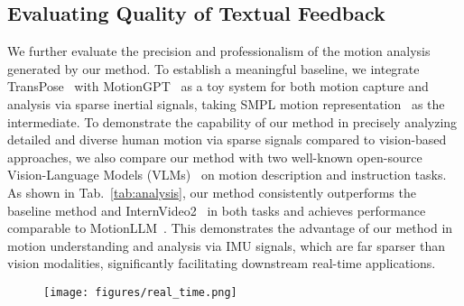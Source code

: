 \subsection{Evaluating Quality of Textual Feedback}
We further evaluate the precision and professionalism of the motion analysis generated by our method. To establish a meaningful baseline, we integrate TransPose~\cite{TransPoseSIGGRAPH2021} with MotionGPT~\cite{jiang2023motiongpt} as a toy system for both motion capture and analysis via sparse inertial signals, taking SMPL motion representation~\cite{SMPL2015} as the intermediate. To demonstrate the capability of our method in precisely analyzing detailed and diverse human motion via sparse signals compared to vision-based approaches, we also compare our method with two well-known open-source Vision-Language Models (VLMs)~\cite{wang2024internvideo2,chen2024motionllm} on motion description and instruction tasks. As shown in Tab.~\ref{tab:analysis}, our method consistently outperforms the baseline method and InternVideo2~\cite{wang2024internvideo2} in both tasks and achieves performance comparable to MotionLLM~\cite{chen2024motionllm}. This demonstrates the advantage of our method in motion understanding and analysis via IMU signals, which are far sparser than vision modalities, significantly facilitating downstream real-time applications. 

\begin{figure}[t]
  \centering
  \texttt{[image: figures/real\_time.png]}
  \captionof{figure}{\textbf{Web-based live demo.} 
  Our system processes streaming IMU signals in real time, enabling simultaneous motion capture and analysis. The live recording of a human performer in real world is displayed alongside the replicated virtual motions in the web interface, which also includes an integrated online chat window.}
\label{fig:real_time}
\end{figure}

